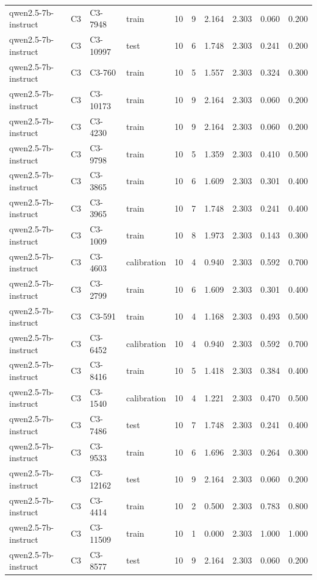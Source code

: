 \begin{table}
\begin{tabular}{llllrrrrrr}
qwen2.5-7b-instruct & C3 & C3-7948 & train & 10 & 9 & 2.164 & 2.303 & 0.060 & 0.200 \\
qwen2.5-7b-instruct & C3 & C3-10997 & test & 10 & 6 & 1.748 & 2.303 & 0.241 & 0.200 \\
qwen2.5-7b-instruct & C3 & C3-760 & train & 10 & 5 & 1.557 & 2.303 & 0.324 & 0.300 \\
qwen2.5-7b-instruct & C3 & C3-10173 & train & 10 & 9 & 2.164 & 2.303 & 0.060 & 0.200 \\
qwen2.5-7b-instruct & C3 & C3-4230 & train & 10 & 9 & 2.164 & 2.303 & 0.060 & 0.200 \\
qwen2.5-7b-instruct & C3 & C3-9798 & train & 10 & 5 & 1.359 & 2.303 & 0.410 & 0.500 \\
qwen2.5-7b-instruct & C3 & C3-3865 & train & 10 & 6 & 1.609 & 2.303 & 0.301 & 0.400 \\
qwen2.5-7b-instruct & C3 & C3-3965 & train & 10 & 7 & 1.748 & 2.303 & 0.241 & 0.400 \\
qwen2.5-7b-instruct & C3 & C3-1009 & train & 10 & 8 & 1.973 & 2.303 & 0.143 & 0.300 \\
qwen2.5-7b-instruct & C3 & C3-4603 & calibration & 10 & 4 & 0.940 & 2.303 & 0.592 & 0.700 \\
qwen2.5-7b-instruct & C3 & C3-2799 & train & 10 & 6 & 1.609 & 2.303 & 0.301 & 0.400 \\
qwen2.5-7b-instruct & C3 & C3-591 & train & 10 & 4 & 1.168 & 2.303 & 0.493 & 0.500 \\
qwen2.5-7b-instruct & C3 & C3-6452 & calibration & 10 & 4 & 0.940 & 2.303 & 0.592 & 0.700 \\
qwen2.5-7b-instruct & C3 & C3-8416 & train & 10 & 5 & 1.418 & 2.303 & 0.384 & 0.400 \\
qwen2.5-7b-instruct & C3 & C3-1540 & calibration & 10 & 4 & 1.221 & 2.303 & 0.470 & 0.500 \\
qwen2.5-7b-instruct & C3 & C3-7486 & test & 10 & 7 & 1.748 & 2.303 & 0.241 & 0.400 \\
qwen2.5-7b-instruct & C3 & C3-9533 & train & 10 & 6 & 1.696 & 2.303 & 0.264 & 0.300 \\
qwen2.5-7b-instruct & C3 & C3-12162 & test & 10 & 9 & 2.164 & 2.303 & 0.060 & 0.200 \\
qwen2.5-7b-instruct & C3 & C3-4414 & train & 10 & 2 & 0.500 & 2.303 & 0.783 & 0.800 \\
qwen2.5-7b-instruct & C3 & C3-11509 & train & 10 & 1 & 0.000 & 2.303 & 1.000 & 1.000 \\
qwen2.5-7b-instruct & C3 & C3-8577 & test & 10 & 9 & 2.164 & 2.303 & 0.060 & 0.200 \\

\end{tabular}
\end{table}
